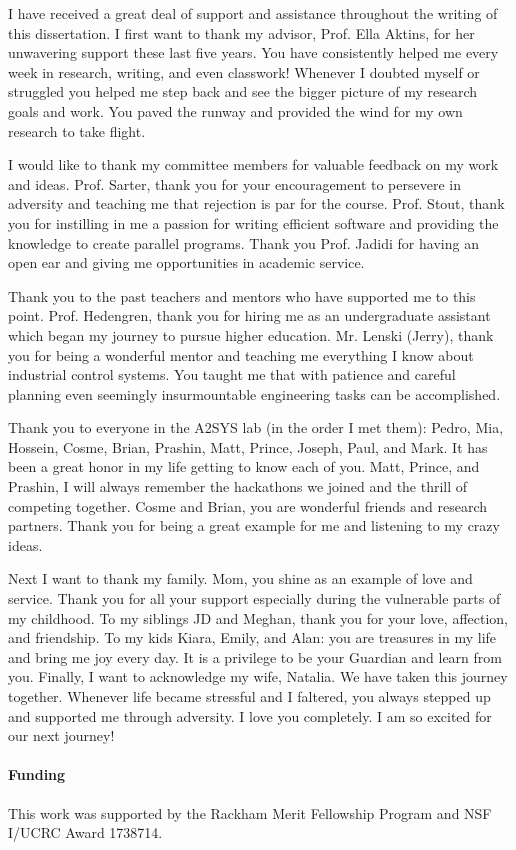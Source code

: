 I have received a great deal of support and assistance throughout the writing of this dissertation. I first want to thank my advisor, Prof. Ella Aktins, for her unwavering support these last five years. You have consistently helped me every week in research, writing, and even classwork! Whenever I doubted myself or struggled you helped me step back and see the bigger picture of my research goals and work. You paved the runway and provided the wind for my own research to take flight.

I would like to thank my committee members for valuable feedback on my work and ideas. Prof. Sarter, thank you for your encouragement to persevere in adversity and teaching me that rejection is par for the course. Prof. Stout, thank you for instilling in me a passion for writing efficient software and providing the knowledge to create parallel programs. Thank you Prof. Jadidi for having an open ear and giving me opportunities in academic service.


Thank you to the past teachers and mentors who have supported me to this point. Prof. Hedengren, thank you for hiring me as an undergraduate assistant which began my journey to pursue higher education. Mr. Lenski (Jerry), thank you for being a wonderful mentor and teaching me everything I know about industrial control systems. You taught me that with patience and careful planning even seemingly insurmountable engineering tasks can be accomplished. 

Thank you to everyone in the A2SYS lab (in the order I met them): Pedro, Mia, Hossein, Cosme, Brian, Prashin, Matt, Prince, Joseph, Paul, and Mark.  It has been a great honor in my life getting to know each of you. Matt, Prince, and Prashin, I will always remember the hackathons we joined and the thrill of competing together. Cosme and Brian, you are wonderful friends and research partners. Thank you for being a great example for me and listening to my crazy ideas.

Next I want to thank my family. Mom, you shine as an example of love and service. Thank you for all your support especially during the vulnerable parts of my childhood. To my siblings JD and Meghan, thank you for your love, affection, and friendship. To my kids Kiara, Emily, and Alan: you are treasures in my life and bring me joy every day. It is a privilege to be your Guardian and learn from you.  Finally, I want to acknowledge my wife, Natalia. We have taken this journey together. Whenever life became stressful and I faltered, you always stepped up and supported me through adversity. I love you completely. I am so excited for our next journey!  


\paragraph{Funding}
This work was supported by the Rackham Merit Fellowship Program and NSF I/UCRC Award 1738714. 


